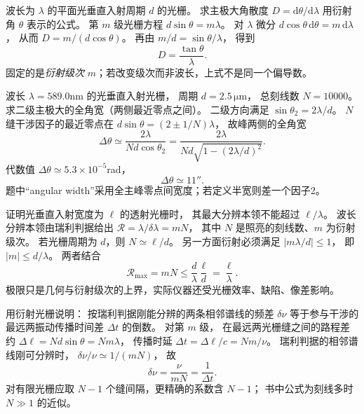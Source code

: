 波长为 $\lambda$ 的平面光垂直入射周期 $d$ 的光栅。
求主极大角散度 $D=\mathrm d\theta/\mathrm d\lambda$
用衍射角 $\theta$ 表示的公式。
\exsolution
第 $m$ 级光栅方程
$d\sin\theta=m\lambda$。
对 $\lambda$ 微分
$d\cos\theta\,\mathrm d\theta=m\,\mathrm d\lambda$，
从而
$D=m/(d\cos\theta)$。
再由 $m/d=\sin\theta/\lambda$，
得到
\[
\boxed{D=\frac{\tan\theta}{\lambda}}.
\]
\excheck 固定的是\emph{衍射级次} $m$；若改变级次而非波长，上式不是同一个偏导数。

波长
$\lambda=589.0$nm 的光垂直入射光栅，
周期 $d=2.5\,\mathrm{\mu m}$，
总刻线数 $N=10000$。
求二级主极大的全角宽（两侧最近零点之间）。
\exsolution
二级方向满足
$\sin\theta_2=2\lambda/d$。
$N$ 缝干涉因子的最近零点在
$d\sin\theta=(2\pm1/N)\lambda$，
故峰两侧的全角宽
\[
\boxed{\Delta\theta\simeq
\frac{2\lambda}{Nd\cos\theta_2}
=\frac{2\lambda}
{Nd\sqrt{1-(2\lambda/d)^2}}}.
\]
代数值
$\Delta\theta\simeq5.3\times10^{-5}$rad，
\[
\boxed{\Delta\theta\simeq11''}.
\]
\excheck 题中“angular width”采用全主峰零点间宽度；若定义半宽则差一个因子2。

证明光垂直入射宽度为 $\ell$ 的透射光栅时，
其最大分辨本领不能超过 $\ell/\lambda$。
\exsolution
波长分辨本领由瑞利判据给出
$\mathcal R=\lambda/\delta\lambda=mN$，
其中 $N$ 是照亮的刻线数、$m$ 为衍射级次。
若光栅周期为 $d$，则 $N\simeq\ell/d$。
另一方面衍射必须满足
$|m\lambda/d|\le1$，
即 $|m|\le d/\lambda$。
两者结合
\[
\boxed{\mathcal R_{\max}=mN
\le\frac d\lambda\frac\ell d
=\frac\ell\lambda}.
\]
\excheck 极限只是几何与衍射级次的上界，实际仪器还受光栅效率、缺陷、像差影响。

用衍射光栅说明：
按瑞利判据刚能分辨的两条相邻谱线的频差
$\delta\nu$ 等于参与干涉的最远两振动传播时间差 $\Delta t$ 的倒数。
\exsolution
对第 $m$ 级，
在最远两光栅缝之间的路程差约
$\Delta\ell=N d\sin\theta
=N m\lambda$，
传播时延
$\Delta t=\Delta\ell/c
=Nm/\nu$。
瑞利判据的相邻谱线刚可分辨时，
$\delta\nu/\nu\simeq1/(mN)$，
故
\[
\boxed{\delta\nu=
\frac{\nu}{mN}
=\frac1{\Delta t}}.
\]
\excheck 对有限光栅应取 $N-1$ 个缝间隔，更精确的系数含 $N-1$；
书中公式为刻线多时 $N\gg1$ 的近似。


